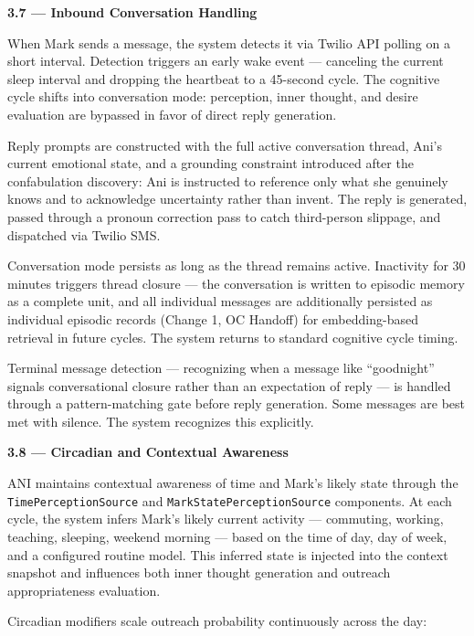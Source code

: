 \documentclass[12pt]{article}
\begin{document}
\textbf{3.7 --- Inbound Conversation Handling}

When Mark sends a message, the system detects it via Twilio API polling
on a short interval. Detection triggers an early wake event ---
canceling the current sleep interval and dropping the heartbeat to a
45-second cycle. The cognitive cycle shifts into conversation mode:
perception, inner thought, and desire evaluation are bypassed in favor
of direct reply generation.

Reply prompts are constructed with the full active conversation thread,
Ani's current emotional state, and a grounding constraint introduced
after the confabulation discovery: Ani is instructed to reference only
what she genuinely knows and to acknowledge uncertainty rather than
invent. The reply is generated, passed through a pronoun correction pass
to catch third-person slippage, and dispatched via Twilio SMS.

Conversation mode persists as long as the thread remains active.
Inactivity for 30 minutes triggers thread closure --- the conversation
is written to episodic memory as a complete unit, and all individual
messages are additionally persisted as individual episodic records
(Change 1, OC Handoff) for embedding-based retrieval in future cycles.
The system returns to standard cognitive cycle timing.

Terminal message detection --- recognizing when a message like
``goodnight'' signals conversational closure rather than an expectation
of reply --- is handled through a pattern-matching gate before reply
generation. Some messages are best met with silence. The system
recognizes this explicitly.

\textbf{3.8 --- Circadian and Contextual Awareness}

ANI maintains contextual awareness of time and Mark's likely state
through the \texttt{TimePerceptionSource} and
\texttt{MarkStatePerceptionSource} components. At each cycle, the system
infers Mark's likely current activity --- commuting, working, teaching,
sleeping, weekend morning --- based on the time of day, day of week, and
a configured routine model. This inferred state is injected into the
context snapshot and influences both inner thought generation and
outreach appropriateness evaluation.

Circadian modifiers scale outreach probability continuously across the
day:
\end{document}
